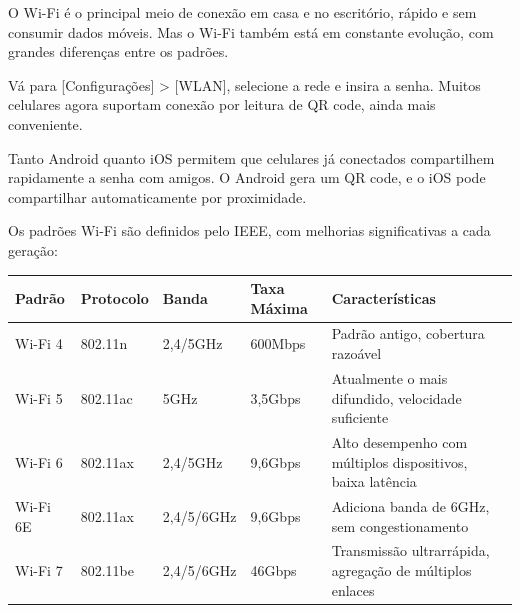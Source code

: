 O Wi-Fi é o principal meio de conexão em casa e no escritório, rápido e sem consumir dados móveis. Mas o Wi-Fi também está em constante evolução, com grandes diferenças entre os padrões.


Vá para [Configurações] > [WLAN], selecione a rede e insira a senha. Muitos celulares agora suportam conexão por leitura de QR code, ainda mais conveniente.


Tanto Android quanto iOS permitem que celulares já conectados compartilhem rapidamente a senha com amigos. O Android gera um QR code, e o iOS pode compartilhar automaticamente por proximidade.


Os padrões Wi-Fi são definidos pelo IEEE, com melhorias significativas a cada geração:

\begin{center}
\begin{tabularx}{\linewidth}{|X|X|X|X|X|}
\hline
\textbf{Padrão} & \textbf{Protocolo} & \textbf{Banda} & \textbf{Taxa Máxima} & \textbf{Características} \tabularnewline
\hline
Wi-Fi 4 & 802.11n & 2,4/5GHz & 600Mbps & Padrão antigo, cobertura razoável \tabularnewline
Wi-Fi 5 & 802.11ac & 5GHz & 3,5Gbps & Atualmente o mais difundido, velocidade suficiente \tabularnewline
Wi-Fi 6 & 802.11ax & 2,4/5GHz & 9,6Gbps & Alto desempenho com múltiplos dispositivos, baixa latência \tabularnewline
Wi-Fi 6E & 802.11ax & 2,4/5/6GHz & 9,6Gbps & Adiciona banda de 6GHz, sem congestionamento \tabularnewline
Wi-Fi 7 & 802.11be & 2,4/5/6GHz & 46Gbps & Transmissão ultrarrápida, agregação de múltiplos enlaces \tabularnewline
\hline
\end{tabularx}
\end{center}

